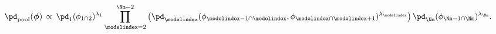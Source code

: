 \begin{equation}
  \pd_{\text{pool}}(\boldsymbol{\phi}) \, \propto \, 
  \pd_{1}(\phi_{1 \cap 2})^{\lambda_{1}}
  \prod_{\modelindex = 2}^{\Nm - 2} \left( 
    \pd_{\modelindex}(\phi_{\modelindex - 1\cap \modelindex}, \phi_{\modelindex \cap \modelindex + 1})^{\lambda_{\modelindex}}
  \right)
  \pd_{\Nm}(\phi_{\Nm - 1 \cap \Nm})^{\lambda_{\Nm}}.
  \label{eqn:M-model-logarithmic-pooling}
\end{equation}